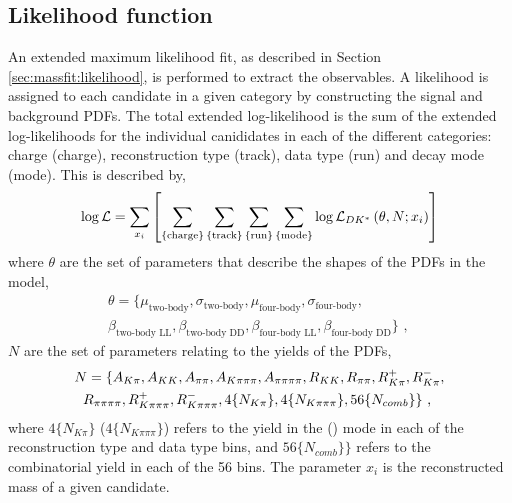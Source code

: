 \subsection{Likelihood function}
\label{sec:cpfit:likelihood}

An extended maximum likelihood fit, as described in Section \ref{sec:massfit:likelihood}, is performed to extract the \CP observables. A likelihood is assigned to each candidate in a given category by constructing the signal and background PDFs. The total extended log-likelihood is the sum of the extended log-likelihoods for the individual canididates in each of the different categories: \B charge (charge), \KS reconstruction type (track), data type (run) and \Dz decay mode (mode). This is described by,
\begin{equation}
\log\mathcal{L} = \sum_{x_i} \left[ \sum_{\{\text{charge}\}}\sum_{\{\text{track}\}}\sum_{\{\text{run}\}}\sum_{\{\text{mode}\}} \log{\mathcal{L}}_{{D}{{K}^*}}\left( \theta, N; x_i \right) \right]
\end{equation}
where $\theta$ are the set of parameters that describe the shapes of the PDFs in the model,
\begin{multline}
\theta = \{\mu_\text{two-body}, \sigma_\text{two-body}, \mu_\text{four-body}, \sigma_\text{four-body}, \\ \beta_\text{two-body LL}, \beta_\text{two-body DD}, \beta_\text{four-body LL}, \beta_\text{four-body DD}\} \text{ , }
\end{multline} 
$N$ are the set of parameters relating to the yields of the PDFs, 
\begin{multline}
N = \{A_{K\pi}, A_{KK}, A_{\pi\pi}, A_{K\pi\pi\pi}, A_{\pi\pi\pi\pi}, R_{KK}, R_{\pi\pi}, R^+_{K\pi}, R^-_{K\pi}, \\ R_{\pi\pi\pi\pi}, R^+_{K\pi\pi\pi}, R^-_{K\pi\pi\pi}, 4\{N_{K\pi}\}, 4\{N_{K\pi\pi\pi}\}, 56\{N_{comb}\}\} \text{ , }
\end{multline}
where $4\{N_{K\pi}\}$ ($4\{N_{K\pi\pi\pi}\}$) refers to the yield in the \kpi (\kpipipi) mode in each of the \KS reconstruction type and data type bins, and $56\{N_{comb}\}\}$ refers to the combinatorial yield in each of the 56 bins. The parameter $x_i$ is  the reconstructed mass of a given candidate.

